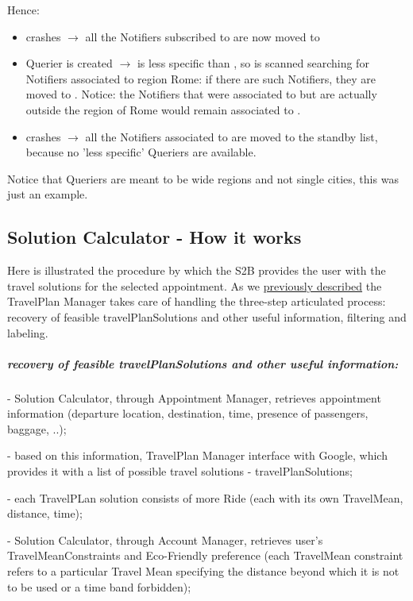 	Hence:
	\begin{itemize}[label=--]
		\item {} crashes $\rightarrow$ all the Notifiers subscribed to  are now moved to 
		\item {} Querier is created $\rightarrow$  is less specific than , so  is scanned searching for Notifiers associated to region Rome: if there are such Notifiers, they are moved to . Notice: the Notifiers that were associated to  but are actually outside the region of Rome would remain associated to .
		\item {} crashes $\rightarrow$ all the Notifiers associated to  are moved to the standby list, because no 'less specific' Queriers are available.
	\end{itemize}
	\smallskip
	Notice that Queriers are meant to be wide regions and not single cities, this was just an example.

\subsection{Solution Calculator - How it works}
		Here is illustrated the procedure by which the S2B provides the user with the travel solutions for the selected appointment.
		As we \hyperref[sect:Select TravelPlan Solution]{previously described} the TravelPlan Manager takes care of handling the three-step  articulated process: recovery of feasible travelPlanSolutions and other useful information, filtering and labeling.
	\subparagraph{recovery of feasible travelPlanSolutions and other useful information:}
	
		- Solution Calculator, through Appointment Manager, retrieves appointment information (departure location, destination, time, presence of passengers, baggage, ..);\newline
		
		- based on this information, TravelPlan Manager interface with Google, which provides it with a list of possible travel solutions - travelPlanSolutions;\newline
		
		- each TravelPLan solution consists of more Ride (each with its own TravelMean, distance, time);\newline
		
		- Solution Calculator, through Account Manager, retrieves user's TravelMeanConstraints and Eco-Friendly preference (each TravelMean constraint refers to a particular Travel Mean specifying the distance beyond which it is not to be used or a time band forbidden);\newline
		
